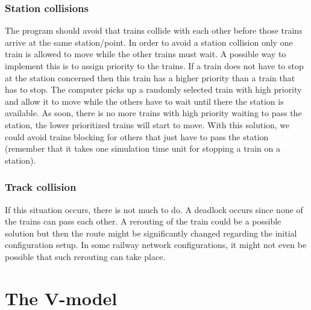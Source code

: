 \documentclass[10pt,a4paper]{article}
\begin{document}
\subsubsection{Station collisions}
 
The program should avoid that trains collide with each other before those trains arrive at the same station/point. In order to avoid a station collision only one train is allowed to move while the other trains must wait. A possible way to implement this is to assign priority to the trains. If a train does not have to stop at the station concerned then this train has a higher priority than a train that has to stop. The computer picks up a randomly selected train with high priority and allow it to move while the others have to wait until there the station is available. As soon, there is no more trains with high priority waiting to pass the station, the lower prioritized trains will start to move.
With this solution, we could avoid trains blocking for others that just have to pass the station (remember that it takes one simulation time unit for stopping a train on a station).
 
\subsubsection{Track collision}
 
If this situation occurs, there is not much to do. A deadlock occurs since none of the trains can pass each other.
A rerouting of the train could be a possible solution but then the route might be significantly changed regarding the initial configuration setup. In some railway network configurations, it might not even be possible that such rerouting can take place.
 

\section{The V-model}
 
\end{document}
